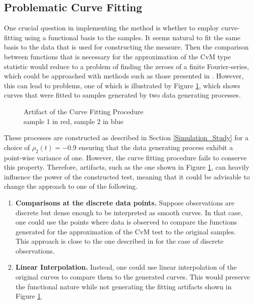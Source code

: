 \documentclass[12pt, a4paper]{article}
\theoremstyle{MAstyle} \newtheorem{assumption}{Assumption}[section]
\theoremstyle{MAstyle} \newtheorem{definition}{Definition}[section]
\theoremstyle{MAstyle} \newtheorem{theorem}{Theorem}[section]
\begin{document}
		\subsection{Problematic Curve Fitting}\label{problem_curve_fitting}
			One crucial question in implementing the method is whether to employ curve-fitting using a functional basis to the samples. It seems natural to fit the same basis to the data that is used for constructing the measure. Then the comparison between functions that is necessary for the approximation of the CvM type statistic would reduce to a problem of finding the zeroes of a finite Fourier-series, which could be approached with methods such as those presented in \cite{boyd_computing_2006}. 
			However, this can lead to problems, one of which is illustrated by Figure \ref{curve_fitting_artefacts}, which shows curves that were fitted to samples generated by two data generating processes.	
			\begin{figure}[H]
				\caption{Artifact of the Curve Fitting Procedure \\
				sample 1 in red, sample 2 in blue}
				\label{curve_fitting_artefacts}
			\end{figure}
			These processes are constructed as described in Section \ref{Simulation_Study} for a choice of $\rho_2(t) = -0.9$ ensuring that the data generating process exhibit a point-wise variance of one. However, the curve fitting procedure fails to conserve this property. Therefore, artifacts, such as the one shown in Figure \ref{curve_fitting_artefacts}, can heavily influence the power of the constructed test, meaning that it could be advisable to change the approach to one of the following.
			\begin{enumerate}
				\item \textbf{Comparisons at the discrete data points.} Suppose observations are discrete but dense enough to be interpreted as smooth curves. In that case, one could use the points where data is observed to compare the functions generated for the approximation of the CvM test to the original samples. This approach is close to the one described in \cite{bugni_permutation_2021} for the case of discrete observations.
				\item \textbf{Linear Interpolation.} Instead, one could use linear interpolation of the original curves to compare them to the generated curves. This would preserve the functional nature while not generating the fitting artifacts shown in Figure \ref{curve_fitting_artefacts}.
			\end{enumerate}
\end{document}
